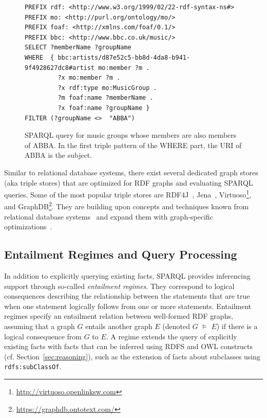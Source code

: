 \documentclass[a4paper,USenglish]{tgdk-v2021}
\newcommand{\myurl}[1]{\footnote{\url{#1}}}
\begin{document}
\begin{figure}[ht]
{\small
\begin{verbatim}
PREFIX rdf: <http://www.w3.org/1999/02/22-rdf-syntax-ns#>
PREFIX mo: <http://purl.org/ontology/mo/>
PREFIX foaf: <http://xmlns.com/foaf/0.1/>
PREFIX bbc: <http://www.bbc.co.uk/music/>
SELECT ?memberName ?groupName
WHERE  { bbc:artists/d87e52c5-bb8d-4da8-b941-9f4928627dc8#artist mo:member ?m .
         ?x mo:member ?m .
         ?x rdf:type mo:MusicGroup .
         ?m foaf:name ?memberName .
         ?x foaf:name ?groupName }
FILTER (?groupName <>  "ABBA")
\end{verbatim}
}
\caption{SPARQL query for music groups whose members are also members of ABBA.
In the first triple pattern of the WHERE part, the URI of ABBA is the subject.
}
\label{fig:spaqrl_abba_members}
\end{figure}

Similar to relational database systems, there exist several dedicated graph stores (aka triple stores) that are optimized for RDF graphs and evaluating SPARQL queries.
Some of the most popular triple stores are RDF4J~\cite{iswc-Broekstra02sesame}, Jena~\cite{DBLP:conf/semweb/WilkinsonSKR03}, Virtuoso\myurl{http://virtuoso.openlinksw.com}, and GraphDB\myurl{https://graphdb.ontotext.com/}. 
They are building upon concepts and techniques known from relational database systems~\cite{DBLP:conf/rweb/HoseSTW11,DBLP:journals/pvldb/NeumannW08} and expand them with graph-specific optimizations~\cite{DBLP:conf/esws/VidalRLMSP10,DBLP:conf/www/StockerSBKR08,DBLP:conf/edbt/Gubichev014,DBLP:conf/kcap/LoustaunauH21,DBLP:conf/semweb/FerradaBH20}.

\subsection{Entailment Regimes and Query Processing}
\label{subsec:entailment}

In addition to explicitly querying existing facts, SPARQL provides inferencing support through so-called \emph{entailment regimes}. They correspond to logical consequences describing the relationship between the statements that are true when one statement logically follows from one or more statements.
Entailment regimes specify an entailment relation between well-formed RDF graphs, assuming that a graph $G$ entails another graph $E$ (denoted $G$ $\models$  $E$) if there is a logical consequence from $G$ to $E$. A regime extends the query of explicitly existing facts with facts that can be inferred using RDFS and OWL constructs (cf. Section~\ref{sec:reasoning}), such as the extension of facts about subclasses using \texttt{rdfs:subClassOf}.
\end{document}
